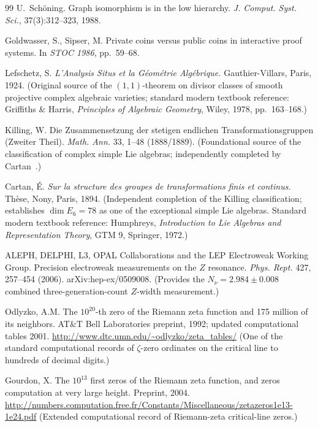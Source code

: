 \documentclass[11pt,a4paper]{amsart}
\theoremstyle{plain}
\theoremstyle{definition}
\begin{document}
\begin{thebibliography}{99}
U.~Sch\"oning.
\newblock Graph isomorphism is in the low hierarchy.
\newblock \emph{J. Comput. Syst. Sci.}, 37(3):312--323, 1988.

Goldwasser, S., Sipser, M.
\newblock Private coins versus public coins in interactive proof systems.
\newblock In \emph{STOC 1986}, pp.~59--68.


Lefschetz, S.
\newblock \emph{L'Analysis Situs et la G\'eom\'etrie Alg\'ebrique.}
\newblock Gauthier-Villars, Paris, 1924. (Original source of the $(1,1)$-theorem on divisor classes of smooth projective complex algebraic varieties; standard modern textbook reference: Griffiths \& Harris, \emph{Principles of Algebraic Geometry}, Wiley, 1978, pp.~163--168.)

Killing, W.
\newblock Die Zusammensetzung der stetigen endlichen Transformationsgruppen (Zweiter Theil).
\newblock \emph{Math. Ann.} 33, 1--48 (1888/1889). (Foundational source of the classification of complex simple Lie algebras; independently completed by Cartan~\cite{cartan1894}.)

Cartan, \'E.
\newblock \emph{Sur la structure des groupes de transformations finis et continus.}
\newblock Th\`ese, Nony, Paris, 1894. (Independent completion of the Killing classification; establishes $\dim E_6 = 78$ as one of the exceptional simple Lie algebras. Standard modern textbook reference: Humphreys, \emph{Introduction to Lie Algebras and Representation Theory}, GTM 9, Springer, 1972.)

ALEPH, DELPHI, L3, OPAL Collaborations and the LEP Electroweak Working Group.
\newblock Precision electroweak measurements on the $Z$ resonance.
\newblock \emph{Phys. Rept.} 427, 257--454 (2006). arXiv:hep-ex/0509008. (Provides the $N_\nu = 2.984 \pm 0.008$ combined three-generation-count $Z$-width measurement.)

Odlyzko, A.M.
\newblock The $10^{20}$-th zero of the Riemann zeta function and 175 million of its neighbors.
\newblock AT\&T Bell Laboratories preprint, 1992; updated computational tables 2001. \url{http://www.dtc.umn.edu/~odlyzko/zeta_tables/} (One of the standard computational records of $\zeta$-zero ordinates on the critical line to hundreds of decimal digits.)

Gourdon, X.
\newblock The $10^{13}$ first zeros of the Riemann zeta function, and zeros computation at very large height.
\newblock Preprint, 2004. \url{http://numbers.computation.free.fr/Constants/Miscellaneous/zetazeros1e13-1e24.pdf} (Extended computational record of Riemann-zeta critical-line zeros.)


\end{thebibliography}
\end{document}
